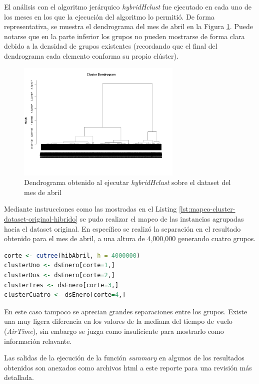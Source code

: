 \documentclass[12pt]{article}
\numberwithin{equation}{section}
\numberwithin{table}{section}
\numberwithin{figure}{section}
\begin{document}
El análisis con el algoritmo jerárquico \emph{hybridHclust} fue ejecutado en cada uno de los meses en los que la ejecución del algoritmo lo permitió.
De forma representativa, se muestra el dendrograma del mes de abril en la Figura \ref{fig:ejecucion-hybrid}.
Puede notarse que en la parte inferior los grupos no pueden mostrarse de forma clara debido a la densidad de grupos existentes (recordando que el final del dendrograma cada elemento conforma su propio clúster).
\begin{figure}
\centering
\includegraphics[width=0.7\textwidth]{imagenes/dendrograma-abril}
\caption{Dendrograma obtenido al ejecutar \emph{hybridHclust} sobre el dataset del mes de abril}
\label{fig:ejecucion-hybrid}
\end{figure}

Mediante instrucciones como las mostradas en el Listing \ref{lst:mapeo-cluster-dataset-original-hibrido} se pudo realizar el mapeo de las instancias agrupadas hacia el dataset original.
En específico se realizó la separación en el resultado obtenido para el mes de abril, a una altura de 4,000,000 generando cuatro grupos.
\begin{lstlisting}[language=R, caption=Mapeo de elementos ubicados en un cluster al dataset original, label={lst:mapeo-cluster-dataset-original-hibrido},]
corte <- cutree(hibAbril, h = 4000000)
clusterUno <- dsEnero[corte=1,]
clusterDos <- dsEnero[corte=2,]
clusterTres <- dsEnero[corte=3,]
clusterCuatro <- dsEnero[corte=4,]
\end{lstlisting}

En este caso tampoco se aprecian grandes separaciones entre los grupos.
Existe una muy ligera diferencia en los valores de la mediana del tiempo de vuelo (\emph{AirTime}), sin embargo se juzga como insuficiente para mostrarlo como información relavante.

Las salidas de la ejecución de la función \emph{summary} en algunos de los resultados obtenidos son anexados como archivos html a este reporte para una revisión más detallada.
\end{document}
